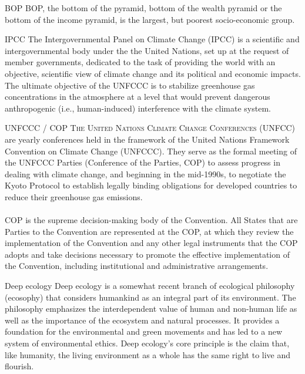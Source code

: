 \begin{sortEnvironment}{BOP}
BOP, the bottom of the pyramid, bottom of the wealth pyramid or the bottom of the income pyramid, is the largest, but poorest socio-economic group.
\end{sortEnvironment}

\begin{sortEnvironment}{IPCC}
The Intergovernmental Panel on Climate Change (IPCC) is a scientific and intergovernmental body under the the United Nations, set up at the request of member governments, dedicated to the task of providing the world with an objective, scientific view of climate change and its political and economic impacts. The ultimate objective of the UNFCCC is to stabilize greenhouse gas concentrations in the atmosphere at a level that would prevent dangerous anthropogenic (i.e., human-induced) interference with the climate system.
\end{sortEnvironment}

\begin{sortEnvironment}{UNFCCC / COP}
\textsc{The United Nations Climate Change Conferences (UNFCC)} are yearly conferences held in the framework of the United Nations Framework Convention on Climate Change (UNFCCC). They serve as the formal meeting of the UNFCCC Parties (Conference of the Parties, COP) to assess progress in dealing with climate change, and beginning in the mid-1990s, to negotiate the Kyoto Protocol to establish legally binding obligations for developed countries to reduce their greenhouse gas emissions. \\
\\
\textsc{COP} is the supreme decision-making body of the Convention. All States that are Parties to the Convention are represented at the COP, at which they review the implementation of the Convention and any other legal instruments that the COP adopts and take decisions necessary to promote the effective implementation of the Convention, including institutional and administrative arrangements.
\end{sortEnvironment}

\begin{sortEnvironment}{Deep ecology}
Deep ecology is a somewhat recent branch of ecological philosophy (ecosophy) that considers humankind as an integral part of its environment. The philosophy emphasizes the interdependent value of human and non-human life as well as the importance of the ecosystem and natural processes. It provides a foundation for the environmental and green movements and has led to a new system of environmental ethics. Deep ecology's core principle is the claim that, like humanity, the living environment as a whole has the same right to live and flourish.
\end{sortEnvironment}

